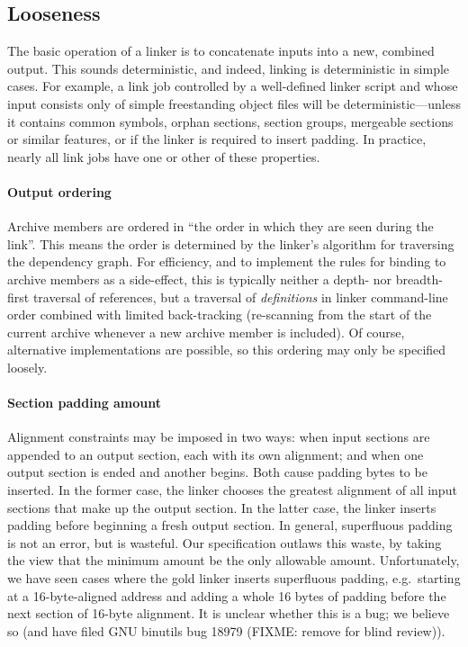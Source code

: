 
\subsection{Looseness}
\label{sec:looseness}

The basic operation of a linker is to concatenate inputs 
into a new, combined output. 
This sounds deterministic, and indeed, linking is deterministic in simple cases.
For example, a link job controlled by a well-defined linker script
and whose input consists only of simple freestanding object files
will be deterministic---unless it contains common symbols, 
orphan sections, section groups, mergeable sections or similar features,
or if the linker is required to insert padding.
In practice, nearly all link jobs have one or other of these properties.

\paragraph{Output ordering}
Archive members are ordered in ``the order in which they are seen during the link''.
This means the order is determined by the linker's algorithm for
traversing the dependency graph. 
For efficiency, 
and to implement the rules for binding to archive members as a side-effect, 
this is typically neither a depth- nor breadth-first traversal of references,
but a traversal of \emph{definitions} in linker command-line order
combined with limited back-tracking 
(re-scanning from the start of the current archive whenever a new archive
member is included).
Of course, alternative implementations are possible, 
so this ordering may only be specified loosely.

\paragraph{Section padding amount}
Alignment constraints may be imposed 
in two ways: when input sections are appended to an output section, 
each with its own alignment; 
and when one output section is ended and another begins.
Both cause padding bytes to be inserted. 
In the former case, the linker chooses the greatest alignment of all input sections
that make up the output section.
In the latter case, the linker inserts padding before beginning a fresh output section.
In general, superfluous padding is not an error, but 
is wasteful.
Our specification outlaws this waste, 
by taking the view that the minimum amount be the only allowable amount.
Unfortunately, we have seen cases where the \textsf{gold} linker inserts
superfluous padding, e.g.\ starting at a 16-byte-aligned address
and adding a whole 16 bytes of padding
before the next section of 16-byte alignment.
It is unclear whether this is a bug; 
we believe so (and have filed GNU binutils bug 18979 (FIXME: remove for blind review)).

